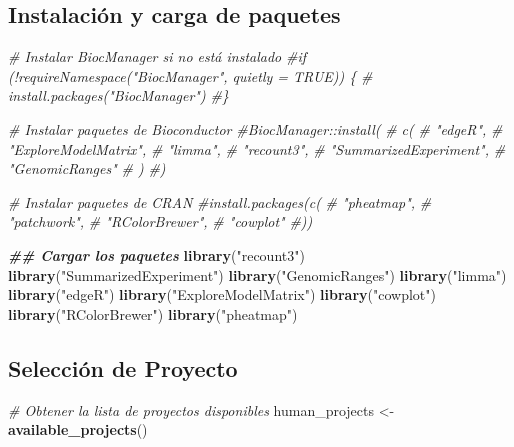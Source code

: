 \documentclass[
]{article}
\newenvironment{Shaded}{\begin{snugshade}}{\end{snugshade}}
\newcommand{\CommentTok}[1]{\textcolor[rgb]{0.56,0.35,0.01}{\textit{#1}}}
\newcommand{\DocumentationTok}[1]{\textcolor[rgb]{0.56,0.35,0.01}{\textbf{\textit{#1}}}}
\newcommand{\FunctionTok}[1]{\textcolor[rgb]{0.13,0.29,0.53}{\textbf{#1}}}
\newcommand{\NormalTok}[1]{#1}
\newcommand{\OtherTok}[1]{\textcolor[rgb]{0.56,0.35,0.01}{#1}}
\newcommand{\StringTok}[1]{\textcolor[rgb]{0.31,0.60,0.02}{#1}}
\begin{document}
\subsection{Instalación y carga de
paquetes}\label{instalaciuxf3n-y-carga-de-paquetes}

\begin{Shaded}
\begin{Highlighting}[]
\CommentTok{\# Instalar BiocManager si no está instalado}
\CommentTok{\#if (!requireNamespace("BiocManager", quietly = TRUE)) \{}
\CommentTok{\#    install.packages("BiocManager")}
\CommentTok{\#\}}

\CommentTok{\# Instalar paquetes de Bioconductor}
\CommentTok{\#BiocManager::install(}
\CommentTok{\#    c(}
\CommentTok{\#        "edgeR", }
\CommentTok{\#        "ExploreModelMatrix",}
\CommentTok{\#        "limma",}
\CommentTok{\#        "recount3", }
\CommentTok{\#        "SummarizedExperiment", }
\CommentTok{\#        "GenomicRanges"}
\CommentTok{\#    )}
\CommentTok{\#)}

\CommentTok{\# Instalar paquetes de CRAN}
\CommentTok{\#install.packages(c(}
\CommentTok{\#    "pheatmap", }
\CommentTok{\#    "patchwork",}
\CommentTok{\#    "RColorBrewer",}
\CommentTok{\#    "cowplot"}
\CommentTok{\#))}

\DocumentationTok{\#\# Cargar los paquetes}
\FunctionTok{library}\NormalTok{(}\StringTok{"recount3"}\NormalTok{)}
\FunctionTok{library}\NormalTok{(}\StringTok{"SummarizedExperiment"}\NormalTok{)}
\FunctionTok{library}\NormalTok{(}\StringTok{"GenomicRanges"}\NormalTok{)}
\FunctionTok{library}\NormalTok{(}\StringTok{"limma"}\NormalTok{)}
\FunctionTok{library}\NormalTok{(}\StringTok{"edgeR"}\NormalTok{)}
\FunctionTok{library}\NormalTok{(}\StringTok{"ExploreModelMatrix"}\NormalTok{)}
\FunctionTok{library}\NormalTok{(}\StringTok{"cowplot"}\NormalTok{)}
\FunctionTok{library}\NormalTok{(}\StringTok{"RColorBrewer"}\NormalTok{)}
\FunctionTok{library}\NormalTok{(}\StringTok{"pheatmap"}\NormalTok{)}
\end{Highlighting}
\end{Shaded}

\subsection{Selección de Proyecto}\label{selecciuxf3n-de-proyecto}

\begin{Shaded}
\begin{Highlighting}[]
\CommentTok{\# Obtener la lista de proyectos disponibles }
\NormalTok{human\_projects }\OtherTok{\textless{}{-}} \FunctionTok{available\_projects}\NormalTok{()}
\end{Highlighting}
\end{Shaded}
\end{document}
